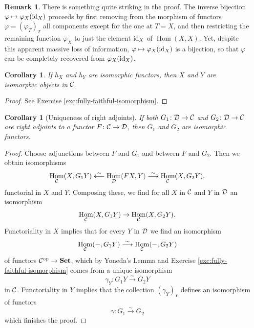 \documentclass[11pt]{amsbook}
\newcommand{\longisomto}{\overset{\sim}{\longrightarrow}}
\newcommand{\isomfrom}{\overset{\sim}{\longleftarrow}}
\DeclareMathOperator\Hom{Hom}
\def\id{{\rm id}}
\def\opp{\mathrm{op}}
\def\Set{\mathbf{Set}}
\theoremstyle{plain}
\newtheorem{corollary}[theorem]{Corollary}
\theoremstyle{definition}
\newtheorem{remark}[theorem]{Remark}
\begin{document}
\begin{remark}
There is something quite striking in the proof. The inverse bijection $\varphi \mapsto \varphi_X(\id_X)$ proceeds by first 
removing from the morphism of functors $\varphi=(\varphi_T)_T$ all components except for the one at $T=X$, and then restricting the remaining function
$\varphi_X$ to just the element $\id_X$ of $\Hom(X,X)$. Yet, despite this apparent massive loss of information, $\varphi \mapsto \varphi_X(\id_X)$ is a bijection, so that $\varphi$ can be completely recovered from $\varphi_X(\id_X)$.
\end{remark}


\begin{corollary}\label{cor:yoneda-iso}
If $h_X$ and $h_Y$ are isomorphic functors, then $X$ and $Y$ are isomorphic objects in ${\mathcal{C}}$. 
\end{corollary}

\begin{proof}
See Exercise \ref{exc:fully-faithful-isomorphism}.
\end{proof}


\begin{corollary}[Uniqueness of right adjoints]
If both $G_1\colon {\mathcal{D}} \to {\mathcal{C}}$ and $G_2\colon {\mathcal{D}} \to {\mathcal{C}}$ are right adjoints to a functor $F\colon {\mathcal{C}} \to {\mathcal{D}}$, then $G_1$ and $G_2$ are isomorphic functors.
\end{corollary}

\begin{proof}
Choose adjunctions between $F$ and $G_1$ and between $F$ and $G_2$. Then we obtain isomorphisms
\[
	 \Hom_\cC( X, G_1Y ) \isomfrom \Hom_\cD( FX, Y ) \longisomto \Hom_\cC( X, G_2Y ),
\]
functorial in $X$ and $Y$. Composing these, we find for all $X$ in ${\mathcal{C}}$ and $Y$ in ${\mathcal{D}}$ an isomorphism
\[
	 \Hom_\cC( X, G_1Y ) \to \Hom_\cC( X, G_2Y ).
\]
Functoriality in $X$ implies that for every $Y$ in ${\mathcal{D}}$ we find an isomorphism 
\[
	 \Hom_\cC( -, G_1Y) \longisomto \Hom_\cC( -, G_2Y )
\]
of functors $\cC^\opp \to \Set$, which by Yoneda's Lemma and Exercise \ref{exc:fully-faithful-isomorphism} 
comes from a unique isomorphism
\[
	\gamma_{Y} \colon G_1Y \longisomto G_2Y
\]
in ${\mathcal{C}}$. Functoriality in $Y$ implies that the collection $(\gamma_Y)_Y$ defines an isomorphism of functors
\[
	\gamma\colon G_1\longisomto G_2
\]
which finishes the proof.
\end{proof}
\end{document}
